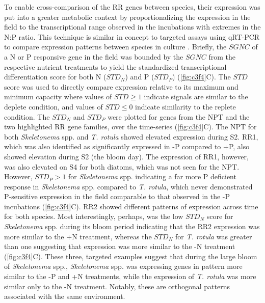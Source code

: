 To enable cross-comparison of the RR genes between species, their expression was put into a greater metabolic context by proportionalizing the expression in the field to the transcriptional range observed in the incubations with extremes in the N:P ratio. This technique is similar in concept to targeted assays using qRT-PCR to compare expression patterns between species in culture \citep{Kang2009}. Briefly, the $SGNC$ of a N or P responsive gene in the field was bounded by the $SGNC$ from the respective nutrient treatments to yield the standardized transcriptional differentiation score for both N ($STD_N$) and P ($STD_P$) (\cref{fig:c3f4}C). The $STD$ score was used to directly compare expression relative to its maximum and minimum capacity where values of $STD \geq 1$ indicate signals are similar to the deplete condition, and values of $STD \leq 0$ indicate similarity to the replete condition. The $STD_N$ and $STD_P$ were plotted for genes from the NPT and the two highlighted RR gene families, over the time-series (\cref{fig:c3f4}C). The NPT for both \textit{Skeletonema} spp. and \textit{T. rotula} showed elevated expression during S2. RR1, which was also identified as significantly expressed in -P compared to +P, also showed elevation during S2 (the bloom day). The expression of RR1, however, was also elevated on S4 for both diatoms, which was not seen for the NPT. However, $STD_P >1$ for \textit{Skeletonema} spp. indicating a far more P deficient response in \textit{Skeletonema} spp. compared to \textit{T. rotula}, which never demonstrated P-sensitive expression in the field comparable to that observed in the -P incubations (\cref{fig:c3f4}C). RR2 showed different patterns of expression across time for both species. Most interestingly, perhaps, was the low $STD_N$ score for \textit{Skeletonema} spp. during its bloom period indicating that the RR2 expression was more similar to the +N treatment, whereas the $STD_N$ for \textit{T. rotula} was greater than one suggesting that expression was more similar to the -N treatment (\cref{fig:c3f4}C). These three, targeted examples suggest that during the large bloom of \textit{Skeletonema} spp., \textit{Skeletonema} spp. was expressing genes in pattern more similar to the -P and +N treatments, while the expression of \textit{T. rotula} was more similar only to the -N treatment. Notably, these are orthogonal patterns associated with the same environment. \par
